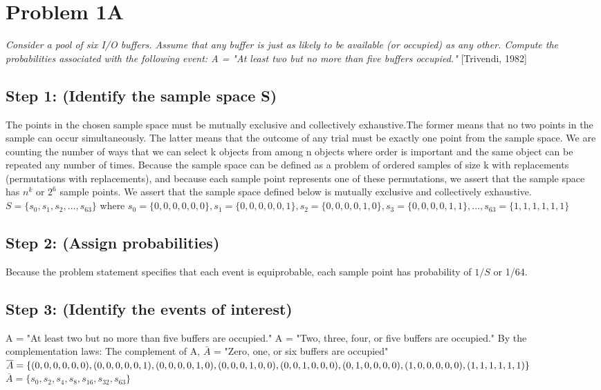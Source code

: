 \documentclass[a4paper,10pt]{article}
\title{}
\author{Mark Johnson \\
Loyola University Chicago}
\date {mjohnson4@luc.edu}
\begin{document}
\maketitle
\section{Problem 1A}
\emph{Consider a pool of six I/O buffers. Assume that any buffer is just as likely to be available (or occupied) as 
any other. Compute the probabilities associated with the following event: \newline
A = "At least two but no more than five buffers occupied."} [Trivendi, 1982]
\subsection{Step 1: (Identify the sample space S)}
The points in the chosen sample space must be mutually exclusive and collectively exhaustive.The former means that no 
two points in the sample can occur simultaneously. The latter means that the outcome of any trial must be exactly one 
point from the sample space. We are counting the number of ways that we can select k objects from among n objects 
where order is important and the same object can be repeated any number of times. Because the sample space can be 
defined as a problem of ordered samples of size k with replacements (permutations with replacements), and because 
each sample point represents one of these permutations, we assert that the sample space has $ n^{k} $ or $ 2^{6} $ 
sample points. We assert that the sample space defined below is mutually exclusive and collectively exhaustive. 
\newline
$ S = \{s_{0}, s_{1}, s_{2},..., s_{63}\} $ where \newline
$ s_{0} = \{0,0,0,0,0,0\}, s_{1} = \{0,0,0,0,0,1\}, s_{2} = \{0,0,0,0,1,0\}, s_{3} = \{0,0,0,0,1,1\},..., s_{63} = 
\{1,1,1,1,1,1\} $
\subsection{Step 2: (Assign probabilities)}
Because the problem statement specifies that each event is equiprobable, each sample point has probability of $ 1/S $ 
or 1/64.
\subsection{Step 3: (Identify the events of interest)}
A = "At least two but no more than five buffers are occupied."
A = "Two, three, four, or five buffers are occupied."
By the complementation laws: \newline
The complement of A, $ \bar{A} $ = "Zero, one, or six buffers are 
occupied"
$ \overline{A} = \{(0,0,0,0,0,0), (0,0,0,0,0,1), (0,0,0,0,1,0), \newline
 (0,0,0,1,0,0), (0,0,1,0,0,0), (0,1,0,0,0,0), (1,0,0,0,0,0), (1,1,1,1,1,1)\} $ \newline
$ \overline{A} = \{s_{0}, s_{2}, s_{4}, s_{8}, s_{16}, s_{32}, s_{63}\} $
\end{document}
